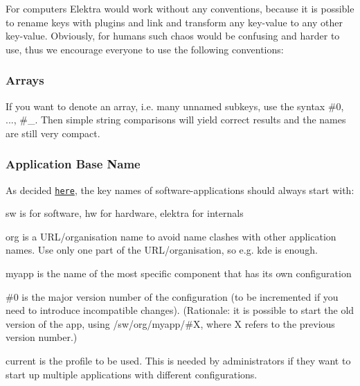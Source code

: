 For computers Elektra would work without any conventions, because it is possible to rename keys with plugins and link and transform any key-\/value to any other key-\/value. Obviously, for humans such chaos would be confusing and harder to use, thus we encourage everyone to use the following conventions\+:

\subsubsection*{Arrays}

If you want to denote an array, i.\+e. many unnamed subkeys, use the syntax {\ttfamily \#0}, ..., {\ttfamily \#\+\_}. Then simple string comparisons will yield correct results and the names are still very compact.

\subsubsection*{Application Base Name}

As decided \href{https://github.com/ElektraInitiative/libelektra/issues/302}{\tt here}, the key names of software-\/applications should always start with\+: 



\begin{DoxyItemize}
\item {\ttfamily sw} is for software, {\ttfamily hw} for hardware, {\ttfamily elektra} for internals
\item {\ttfamily org} is a U\+R\+L/organisation name to avoid name clashes with other application names. Use only one part of the U\+R\+L/organisation, so e.\+g. {\ttfamily kde} is enough.
\item {\ttfamily myapp} is the name of the most specific component that has its own configuration
\item {\ttfamily \#0} is the major version number of the configuration (to be incremented if you need to introduce incompatible changes). (Rationale\+: it is possible to start the old version of the app, using {\ttfamily /sw/org/myapp/\#X}, where {\ttfamily X} refers to the previous version number.)
\item {\ttfamily current} is the profile to be used. This is needed by administrators if they want to start up multiple applications with different configurations.
\end{DoxyItemize}

